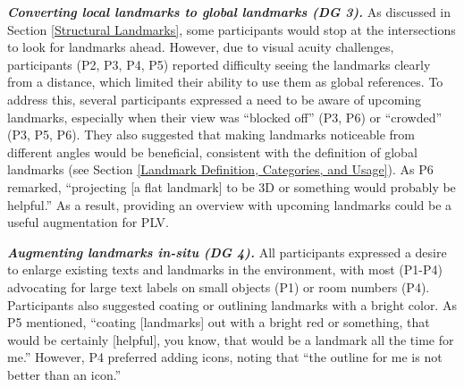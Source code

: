 \textbf{\textit{Converting local landmarks to global landmarks (DG 3).}}\label{Converting local landmarks to global landmarks.} As discussed in Section \ref{Structural Landmarks}, some participants would stop at the intersections to look for landmarks ahead. However, due to visual acuity challenges, participants (P2, P3, P4, P5) reported difficulty seeing the landmarks clearly from a distance, which limited their ability to use them as global references. To address this, several participants expressed a need to be aware of upcoming landmarks, especially when their view was ``blocked off'' (P3, P6) or ``crowded'' (P3, P5, P6). They also suggested that making landmarks noticeable from different angles would be beneficial, consistent with the definition of global landmarks (see Section \ref{Landmark Definition, Categories, and Usage}). As P6 remarked, ``projecting [a flat landmark] to be 3D or something would probably be helpful.'' As a result, providing an overview with upcoming landmarks could be a useful augmentation for PLV.




\textbf{\textit{Augmenting landmarks in-situ (DG 4).}} All participants expressed a desire to enlarge existing texts and landmarks in the environment, with most (P1-P4) advocating for large text labels on small objects (P1) or room numbers (P4). Participants also suggested coating or outlining landmarks with a bright color. As P5 mentioned, ``coating [landmarks] out with a bright red or something, that would be certainly [helpful], you know, that would be a landmark all the time for me.'' 
However, P4 preferred adding icons, noting that ``the outline for me is not better than an icon.''




